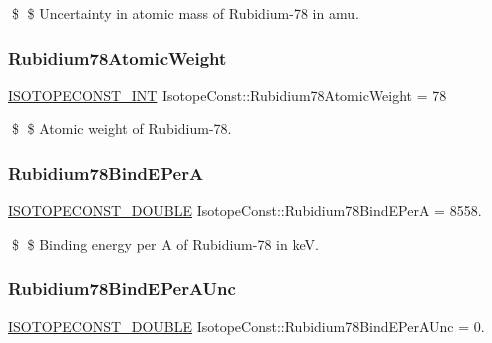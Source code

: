 \$ \$ Uncertainty in atomic mass of Rubidium-\/78 in amu. \mbox{\label{group___isotope_const-_rubidium-_rb78_gae0c80a3354ed463bb1baadc123e17f61}} 
\subsubsection{\texorpdfstring{Rubidium78\+Atomic\+Weight}{Rubidium78AtomicWeight}}
{\footnotesize\ttfamily \mbox{\hyperlink{group___isotope_const-_macros_ga5f18360b3e99483a35c32d789e62621c}{I\+S\+O\+T\+O\+P\+E\+C\+O\+N\+S\+T\+\_\+\+I\+NT}} Isotope\+Const\+::\+Rubidium78\+Atomic\+Weight = 78}

\$ \$ Atomic weight of Rubidium-\/78. \mbox{\label{group___isotope_const-_rubidium-_rb78_gace8bbc7270f17354f06dcd0d9093a953}} 
\subsubsection{\texorpdfstring{Rubidium78\+Bind\+E\+PerA}{Rubidium78BindEPerA}}
{\footnotesize\ttfamily \mbox{\hyperlink{group___isotope_const-_macros_ga8f45a7272ce02c0b4c65c44636ed719a}{I\+S\+O\+T\+O\+P\+E\+C\+O\+N\+S\+T\+\_\+\+D\+O\+U\+B\+LE}} Isotope\+Const\+::\+Rubidium78\+Bind\+E\+PerA = 8558.}

\$ \$ Binding energy per A of Rubidium-\/78 in keV. \mbox{\label{group___isotope_const-_rubidium-_rb78_ga05ba0215c20f24b3bb907d8787b592e3}} 
\subsubsection{\texorpdfstring{Rubidium78\+Bind\+E\+Per\+A\+Unc}{Rubidium78BindEPerAUnc}}
{\footnotesize\ttfamily \mbox{\hyperlink{group___isotope_const-_macros_ga8f45a7272ce02c0b4c65c44636ed719a}{I\+S\+O\+T\+O\+P\+E\+C\+O\+N\+S\+T\+\_\+\+D\+O\+U\+B\+LE}} Isotope\+Const\+::\+Rubidium78\+Bind\+E\+Per\+A\+Unc = 0.}

